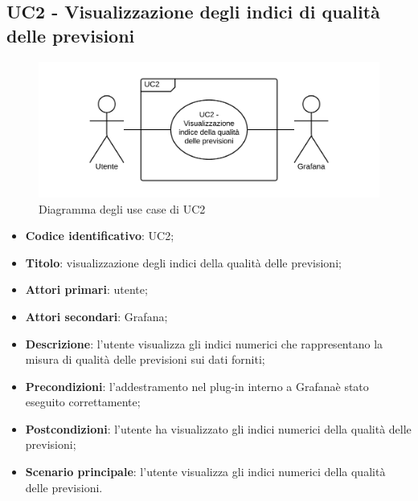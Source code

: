 \subsection{UC2 - Visualizzazione degli indici di qualità delle previsioni}
\begin{figure}[H]
\includegraphics{img/UC2_-_Visualizzazione_indice_della_qualit_delle_previsioni.png}
\caption{Diagramma degli use case di UC2}
\end{figure}
\begin{itemize}
	\item \textbf{Codice identificativo}: UC2;
	\item \textbf{Titolo}: visualizzazione degli indici della qualità delle previsioni;
	\item \textbf{Attori primari}: utente;
	\item \textbf{Attori secondari}: Grafana\glo;
	\item \textbf{Descrizione}: l'utente visualizza gli indici numerici che rappresentano la misura di qualità delle previsioni sui dati forniti;
	\item \textbf{Precondizioni}: l'addestramento nel plug-in interno a Grafana\glosp è stato eseguito correttamente;
	\item \textbf{Postcondizioni}: l'utente ha visualizzato gli indici numerici della qualità delle previsioni;
	\item \textbf{Scenario principale}: l'utente visualizza gli indici numerici della qualità delle previsioni.
\end{itemize}
